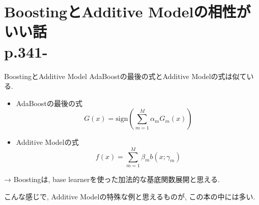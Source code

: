 \documentclass[dvipdfmx,8pt]{beamer}
\begin{document}
  \section{BoostingとAdditive Modelの相性がいい話\\p.341-}
  \begin{frame}{BoostingとAdditive Model}
    AdaBoostの最後の式とAdditive Modelの式は似ている.
    \begin{itemize}
      \item AdaBoostの最後の式
        \[
          G(x)=\mathrm{sign}\left ( \sum_{m=1}^{M}\alpha_{m}G_{m}(x) \right )
        \]
      \item Additive Modelの式
        \[
          f(x)=\sum_{m=1}^{M}\beta_{m}b(x; \gamma_{m})
        \]
    \end{itemize}

    → Boostingは, base learnerを使った加法的な基底関数展開と思える.

    こんな感じで, Additive Modelの特殊な例と思えるものが, この本の中には多い.
  \end{frame}
\end{document}
